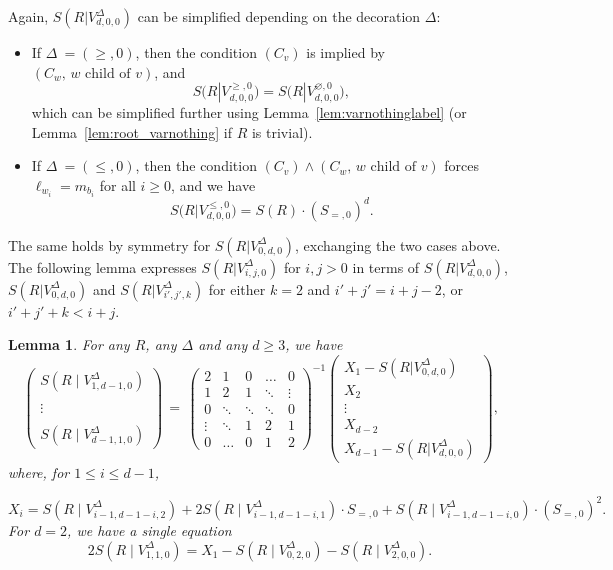 \documentclass[12pt]{amsart}
\newcommand{\revision}[1]{{#1}}
\theoremstyle{plain}
\newtheorem{lemma}{Lemma}
\theoremstyle{remark}
\begin{document}
Again, $S(R|V^{\Delta}_{d,0,0})$ can be simplified depending on the decoration $\Delta$:
\begin{itemize}
\item If $\Delta\ =(\geq,0)$, then the condition $(C_v)$ is implied by 
$(C_w, \, w\text{ child of }v)$, and
\begin{equation}
\label{eq:V2}
 S\big(R|V^{\geq,0}_{d,0,0}\big)=S\big(R|V^{\varnothing,0}_{d,0,0}\big),
\end{equation}
which can be simplified further using Lemma~\ref{lem:varnothinglabel} (or Lemma~\ref{lem:root_varnothing} if $R$ is trivial).
\item If $\Delta\ =(\leq,0)$, then the condition 
$(C_v) \wedge (C_w, \, w\text{ child of }v)$ forces $\ell_{w_i}=m_{b_i}$ for all $i \ge 0$,
and we have
\begin{equation}
\label{eq:V3}
S\big(R|V^{\leq,0}_{d,0,0}\big)=S(R) \cdot (S_{=,0})^d.
\end{equation}
\end{itemize}
The same holds by symmetry for $S(R|V^{\Delta}_{0,d,0})$, exchanging the two cases above.
The following lemma \revision{expresses} $S(R|V^{\Delta}_{i,j,0})$ for $i,j>0$
\revision{in terms of}
 $S(R|V^{\Delta}_{d,0,0})$, $S(R|V^{\Delta}_{0,d,0})$
and $S(R|V^{\Delta}_{i',j',k})$ for either $k = 2$ and $i'+j'=i+j-2$, or $i'+j'+k < i+j$.
\begin{lemma}
\label{lem:linear_system}
  For any $R$, any $\Delta$ and any $d \ge 3$, we have
\[  \,  \begin{pmatrix}
    S( R \mid V^{\Delta}_{1,d-1,0} )\\
    \\
    \vdots \\
    \\
     S( R \mid V^{\Delta}_{d-1,1,0} )
  \end{pmatrix} 
  \, = \,  \revision{\begin{pmatrix}
    2 & 1 & 0 & \ldots &0 \\
    1 & 2 & 1 & \ddots & \vdots \\
    0 & \ddots  & \ddots & \ddots & 0 \\
    \vdots & \ddots & 1 & 2 & 1  \\
    0 & \ldots &0 & 1 & 2
  \end{pmatrix}^{-1}} \begin{pmatrix}
    X_1 - S(R|V^{\Delta}_{0,d,0}) \\ X_2 \\ \vdots \\ X_{d-2} \\ X_{d-1} -S(R|V^{\Delta}_{d,0,0}) 
  \end{pmatrix}, \]
  where, for $1 \le i \le d-1$,
 
  $$X_i=S(R \mid V^{\Delta}_{i-1,d-1-i,2}) + 2S(R \mid V^{\Delta}_{i-1,d-1-i,1}) \cdot S_{=,0} + S(R \mid V^{\Delta}_{i-1,d-1-i,0}) \cdot (S_{=,0})^2.
  $$
  For $d=2$, we have a single equation
  \[2S(R \mid V^{\Delta}_{1,1,0})=X_1-S(R \mid V^{\Delta}_{0,2,0})-S(R \mid V^{\Delta}_{2,0,0}).\]
\end{lemma}
\end{document}
